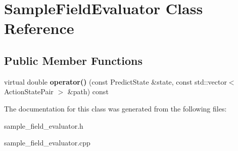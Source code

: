 \hypertarget{classSampleFieldEvaluator}{
\section{SampleFieldEvaluator Class Reference}
\label{classSampleFieldEvaluator}
}
\subsection*{Public Member Functions}
\begin{DoxyCompactItemize}
\item 
\hypertarget{classSampleFieldEvaluator_abfa54f95073bbc08983b6856ec104d3f}{
virtual double {\bfseries operator()} (const PredictState \&state, const std::vector$<$ ActionStatePair $>$ \&path) const }
\label{classSampleFieldEvaluator_abfa54f95073bbc08983b6856ec104d3f}

\end{DoxyCompactItemize}


The documentation for this class was generated from the following files:\begin{DoxyCompactItemize}
\item 
sample\_\-field\_\-evaluator.h\item 
sample\_\-field\_\-evaluator.cpp\end{DoxyCompactItemize}
